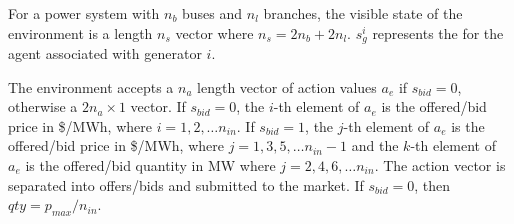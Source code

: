 For a power system with $n_b$ buses and $n_l$ branches, the visible state of
the environment is a length $n_s$ vector where $n_s = 2n_b + 2n_l$.  $s^i_g$
represents the  for the agent associated with generator $i$.

The environment accepts a $n_a$ length vector of action values
$a_e$ if $s_{bid} = 0$, otherwise a $2n_a \times 1$ vector.  If $s_{bid} = 0$,
the $i$-th element of $a_e$ is the offered/bid price in \$/MWh, where
$i = 1,2,\dotsc n_{in}$.  If $s_{bid} = 1$, the $j$-th element of $a_e$ is the
offered/bid price in \$/MWh, where $j = 1,3,5,\dotsc n_{in}-1$ and the $k$-th
element of $a_e$ is the offered/bid quantity in MW where $j = 2,4,6,\dotsc
n_{in}$.  The action vector is separated into offers/bids and submitted to the
market.  If $s_{bid} = 0$, then $qty = p_{max}/n_{in}$.

